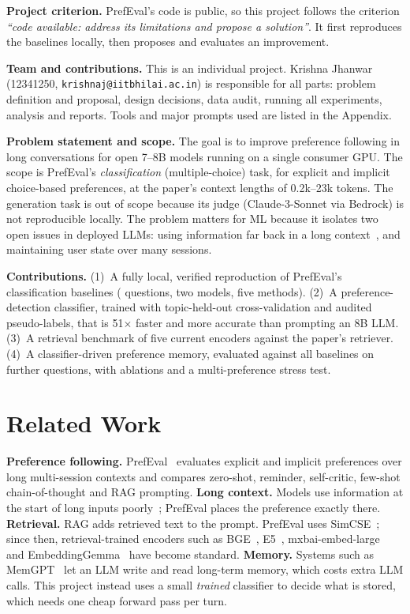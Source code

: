 \documentclass[lettersize,journal]{IEEEtran}
\begin{document}
\textbf{Project criterion.} PrefEval's code is public, so this project follows the criterion \emph{``code available: address its
limitations and propose a solution''}. It first reproduces the baselines locally, then proposes and evaluates an improvement.

\textbf{Team and contributions.} This is an individual project. Krishna Jhanwar (12341250, \texttt{krishnaj@iitbhilai.ac.in}) is
responsible for all parts: problem definition and proposal, design decisions, data audit, running all experiments, analysis and reports.
Tools and major prompts used are listed in the Appendix.

\textbf{Problem statement and scope.} The goal is to improve preference following in long conversations for open 7--8B models running on a
single consumer GPU. The scope is PrefEval's \emph{classification} (multiple-choice) task, for explicit and implicit choice-based preferences, at
the paper's context lengths of 0.2k--23k tokens. The generation task is out of scope because its judge (Claude-3-Sonnet via Bedrock) is not
reproducible locally. The problem matters for ML because it isolates two open issues in deployed LLMs: using information far back in a long
context~\cite{lostmiddle}, and maintaining user state over many sessions.

\textbf{Contributions.}
(1)~A fully local, verified reproduction of PrefEval's classification baselines (\nQuestions{} questions, two models, five methods).
(2)~A preference-detection classifier, trained with topic-held-out cross-validation and audited pseudo-labels, that is 51$\times$ faster and more
accurate than prompting an 8B LLM.
(3)~A retrieval benchmark of five current encoders against the paper's retriever.
(4)~A classifier-driven preference memory, evaluated against all baselines on \qTotalQ{} further questions, with ablations and a
multi-preference stress test.

\section{Related Work}
\textbf{Preference following.} PrefEval~\cite{prefeval} evaluates explicit and implicit preferences over long multi-session contexts and
compares zero-shot, reminder, self-critic, few-shot chain-of-thought and RAG prompting.
\textbf{Long context.} Models use information at the start of long inputs poorly~\cite{lostmiddle}; PrefEval places the preference exactly there.
\textbf{Retrieval.} RAG adds retrieved text to the prompt. PrefEval uses SimCSE~\cite{simcse}; since then, retrieval-trained encoders
such as BGE~\cite{bge}, E5~\cite{e5}, mxbai-embed-large~\cite{mxbai} and EmbeddingGemma~\cite{embeddinggemma} have become standard.
\textbf{Memory.} Systems such as MemGPT~\cite{memgpt} let an LLM write and read long-term memory, which costs extra LLM calls.
This project instead uses a small \emph{trained} classifier to decide what is stored, which needs one cheap forward pass per turn.
\end{document}
